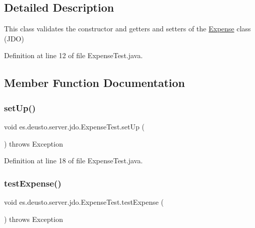 \subsection{Detailed Description}
This class validates the constructor and getters and setters of the \hyperlink{classes_1_1deusto_1_1server_1_1jdo_1_1_expense}{Expense} class (J\+DO) 

Definition at line 12 of file Expense\+Test.\+java.



\subsection{Member Function Documentation}
\mbox{\label{classes_1_1deusto_1_1server_1_1jdo_1_1_expense_test_a6e23388add90f6a9465a6befc55978c2}} 
\subsubsection{\texorpdfstring{set\+Up()}{setUp()}}
{\footnotesize\ttfamily void es.\+deusto.\+server.\+jdo.\+Expense\+Test.\+set\+Up (\begin{DoxyParamCaption}{ }\end{DoxyParamCaption}) throws Exception}



Definition at line 18 of file Expense\+Test.\+java.

\mbox{\label{classes_1_1deusto_1_1server_1_1jdo_1_1_expense_test_a90db3b35017b6000665199694d7f715d}} 
\subsubsection{\texorpdfstring{test\+Expense()}{testExpense()}}
{\footnotesize\ttfamily void es.\+deusto.\+server.\+jdo.\+Expense\+Test.\+test\+Expense (\begin{DoxyParamCaption}{ }\end{DoxyParamCaption}) throws Exception}

